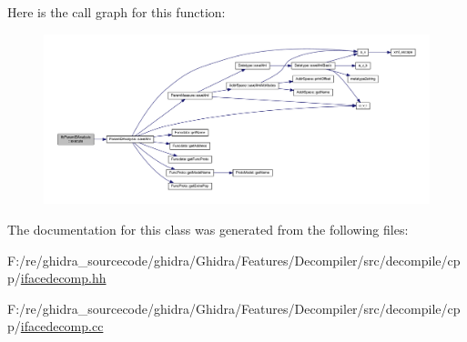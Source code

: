 Here is the call graph for this function\+:
\nopagebreak
\begin{figure}[H]
\begin{center}
\leavevmode
\includegraphics[width=350pt]{class_ifc_param_i_d_analysis_a2d04839fdf4e27a6dc1e5240ee3f8555_cgraph}
\end{center}
\end{figure}


The documentation for this class was generated from the following files\+:\begin{DoxyCompactItemize}
\item 
F\+:/re/ghidra\+\_\+sourcecode/ghidra/\+Ghidra/\+Features/\+Decompiler/src/decompile/cpp/\mbox{\hyperlink{ifacedecomp_8hh}{ifacedecomp.\+hh}}\item 
F\+:/re/ghidra\+\_\+sourcecode/ghidra/\+Ghidra/\+Features/\+Decompiler/src/decompile/cpp/\mbox{\hyperlink{ifacedecomp_8cc}{ifacedecomp.\+cc}}\end{DoxyCompactItemize}
